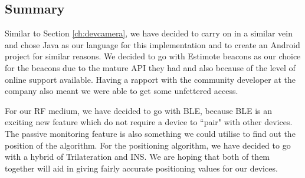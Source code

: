\subsection{Summary}
Similar to Section \ref{ch:devcamera}, we have decided to carry on in a similar vein and chose Java as our language for this implementation and to create an Android project for similar reasons. We decided to go with Estimote beacons as our choice for the beacons due to the mature API they had and also because of the level of online support available. Having a rapport with the community developer at the company also meant we were able to get some unfettered access. 

For our RF medium, we have decided to go with BLE, because BLE is an exciting new feature which do not require a device to ``pair" with other devices. The passive monitoring feature is also something we could utilise to find out the position of the algorithm. For the positioning algorithm, we have decided to go with a hybrid of Trilateration and INS. We are hoping that both of them together will aid in giving fairly accurate positioning values for our devices.